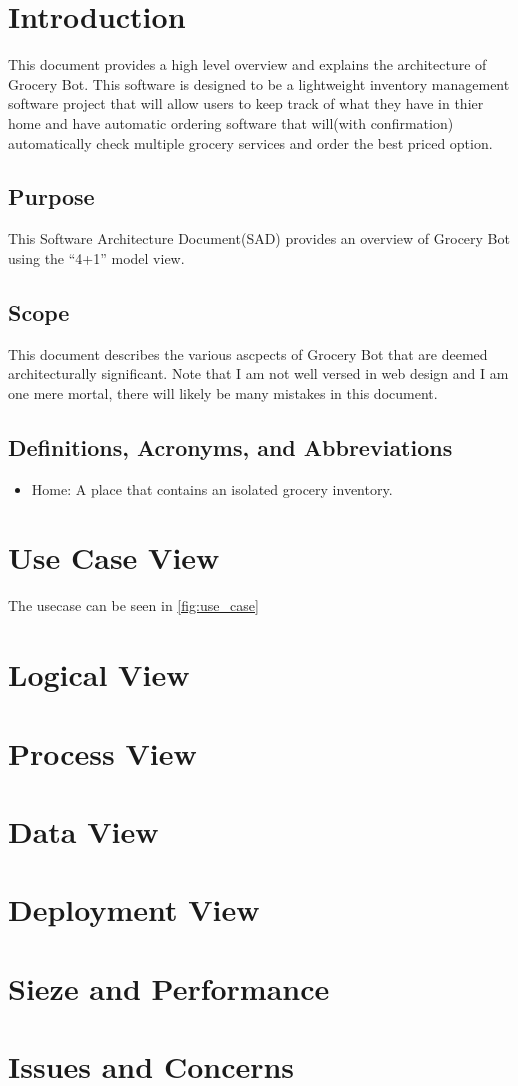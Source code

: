 

\section{Introduction}
This document provides a high level overview and explains the architecture of Grocery Bot. This software is
designed to be a lightweight inventory management software project that will allow users to keep track of what
they have in thier home and have automatic ordering software that will(with confirmation) automatically check
multiple grocery services and order the best priced option.


\subsection{Purpose}
This Software Architecture Document(SAD) provides an overview of Grocery Bot using the ``4+1'' model view.


\subsection{Scope}
This document describes the various ascpects of Grocery Bot that are deemed architecturally significant. Note
that I am not well versed in web design and I am one mere mortal, there will likely be many mistakes in this
document.

\subsection{Definitions, Acronyms, and Abbreviations}
\begin{itemize}
\item Home: A place that contains an isolated grocery inventory.
\end{itemize}

\section{Use Case View}
The usecase can be seen in \autoref{fig:use_case}

\section{Logical View}

\section{Process View}

\section{Data View}

\section{Deployment View}

\section{Sieze and Performance}

\section{Issues and Concerns}



  